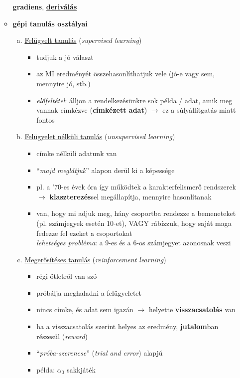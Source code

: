 \documentclass[a4paper, 11pt]{article}
\begin{document}
\begin{enumerate}[A)]
\begin{itemize}
\begin{center}
			\textbf{gradiens}, \underline{\textbf{deriválás}}
		\end{center}
		\newpage
		\item \textbf{gépi tanulás osztályai}
		\begin{enumerate}[(a)]
			\item  \underline{Felügyelt tanulás} (\textit{supervised learning})
			\begin{itemize}
				\item tudjuk a jó választ
				\item az MI eredményét összehasonlíthatjuk vele (jó-e vagy sem, mennyire jó, stb.)
				\item \textit{előfeltétel}: álljon a rendelkezésünkre sok példa / adat, amik meg vannak címkézve (\textbf{címkézett adat}) $\to$ ez a súlyállítgatás miatt fontos
			\end{itemize}
			\item  \underline{Felügyelet nélküli tanulás} (\textit{unsupervised learning})
			\begin{itemize}
				\item címke nélküli adatunk van
				\item ``\textit{majd meglátjuk}'' alapon derül ki a képessége
				\item pl. a '70-es évek óra így működtek a karakterfelismerő rendszerek $\to$ \textbf{klaszterezés}sel megállapítja, mennyire hasonlítanak
				\item van, hogy mi adjuk meg, hány csoportba rendezze a bemeneteket (pl. számjegyek esetén 10-et), VAGY rábízzuk, hogy saját maga fedezze fel ezeket a csoportokat
				\\ \textit{lehetséges probléma}:  a 9-es és a 6-os számjegyet azonosnak veszi
			\end{itemize}
			\item  \underline{Megerősítéses tanulás} (\textit{reinforcement learning})
			\begin{itemize}
				\item régi ötletről van szó
				\item próbálja meghaladni a felügyeletet
				\item nincs címke, és adat sem igazán $\to$ helyette \textbf{visszacsatolás} van
				\item ha a visszacsatolás szerint helyes az eredmény, \textbf{jutalom}ban részesül (\textit{reward})
				\item ``\textit{próba-szerencse}'' (\textit{trial and error}) alapjú
				\item példa: $\alpha_0$ sakkjáték

\end{itemize}
\end{enumerate}
\end{itemize}
\end{enumerate}
\end{document}
